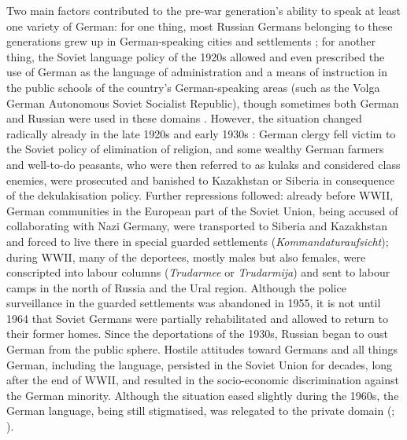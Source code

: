 Two main factors contributed to the pre-war generation's ability to speak at least one variety of German: for one thing, most  Russian Germans belonging to these generations grew up in German-speaking cities and settlements \citep[cf.][]{berend98}; for another thing, the Soviet language policy of the 1920s allowed and even prescribed the use of German as the language of administration and a means of instruction in the public schools of the country's German-speaking areas (such as the Volga German Autonomous Soviet Socialist Republic), though sometimes both German and Russian were used in these domains \citep[cf.][]{meng01,riehlTA}. However, the situation changed radically already in the late 1920s and early 1930s \citep[cf.][]{mukhina}: German clergy fell victim to the Soviet policy of elimination of religion, and some wealthy German farmers and well-to-do peasants, who were then referred to as kulaks and considered class enemies, were prosecuted and banished to Kazakhstan or Siberia in consequence of the dekulakisation policy. Further repressions followed: already before WWII, German communities in the European part of the Soviet Union, being accused of collaborating with Nazi Germany, were transported to Siberia and Kazakhstan and forced to live there in special guarded settlements (\textit{Kommandaturaufsicht}); during WWII, many of the deportees, mostly males but also females, were conscripted into labour columns (\textit{Trudarmee} or \textit{Trudarmija}) and sent to labour camps in the north of Russia and the Ural region. Although the police surveillance in the guarded settlements was abandoned in 1955, it is not until 1964 that Soviet Germans were partially rehabilitated and allowed to return to their former homes. Since the deportations of the 1930s, Russian began to oust German from the public sphere. Hostile attitudes toward Germans and all things German, including the language, persisted in the Soviet Union for decades, long after the end of WWII, and resulted in the socio-economic discrimination against the German minority. Although the situation eased slightly during the 1960s, the German language, being still stigmatised, was relegated to the private domain (\citealt[49]{berend98}; \citealt[21]{blankenhorn}). 

